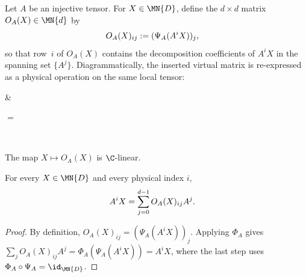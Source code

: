 \begin{definition}\label{def:phys_realize}
    \leanok
    Let $A$ be an injective tensor.
    For $X\in\MN{D}$, define the $d\times d$ matrix
    $O_A(X)\in\MN{d}$ by
    \begin{align}
        O_A(X)_{ij}
         & :=(\Psi_A(A^iX))_j,
        \notag
    \end{align}
    so that row~$i$ of $O_A(X)$ contains the decomposition coefficients
    of $A^iX$ in the spanning set $\{A^j\}$.
    Diagrammatically, the inserted virtual matrix is re-expressed as a
    physical operation on the same local tensor:
    \begin{center}
        \tenkzkernel
        \begin{tenkz}[cols=2, west=open, east=open]
             & 
        \end{tenkz}
        $ = $
        \begin{tenkz}[rows={op,ket}, cols=1]
             \\
        \end{tenkz}
    \end{center}
    The map $X\mapsto O_A(X)$ is $\C$-linear.
\end{definition}

\begin{lemma}%
    \label{lem:physRealize_spec}
    \leanok
    For every $X\in\MN{D}$ and every physical index $i$,
    \begin{align}
        A^iX
         & =\sum_{j=0}^{d-1}O_A(X)_{ij}A^j.
        \notag
    \end{align}
\end{lemma}

\begin{proof}
    \leanok
    By definition, $O_A(X)_{ij}=(\Psi_A(A^iX))_j$.
    Applying $\Phi_A$ gives
    $\sum_jO_A(X)_{ij}A^j=\Phi_A(\Psi_A(A^iX))=A^iX$,
    where the last step uses
    $\Phi_A\circ\Psi_A=\id_{\MN{D}}$.
\end{proof}

